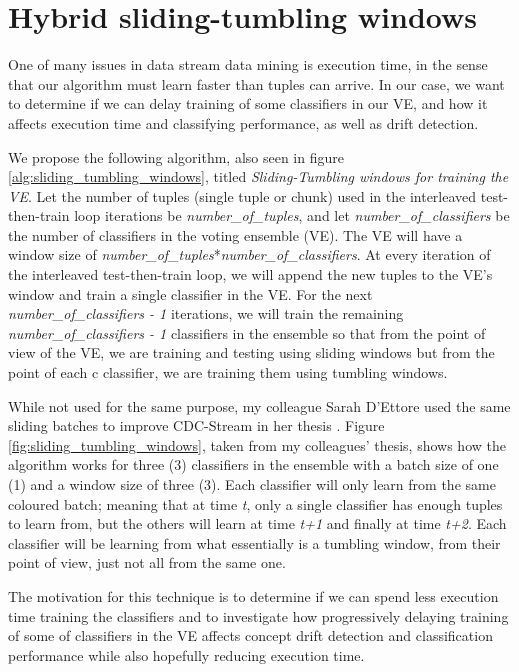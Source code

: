
\section{Hybrid sliding-tumbling windows}
One of many issues in data stream data mining is execution time, in the sense that our algorithm must learn faster than tuples can arrive. In our case, we want to determine if we can delay training of some classifiers in our VE, and how it affects execution time and classifying performance, as well as drift detection.

We propose the following algorithm, also seen in figure \ref{alg:sliding_tumbling_windows}, titled \textit{Sliding-Tumbling windows for training the VE}.
Let the number of tuples (single tuple or chunk) used in the interleaved test-then-train loop iterations be \textit{number\_of\_tuples}, and let \textit{number\_of\_classifiers} be the number of classifiers in the voting ensemble (VE). The VE will have a window size of \textit{number\_of\_tuples}*\textit{number\_of\_classifiers}. At every iteration of the interleaved test-then-train loop, we will append the new tuples to the VE's window and train a single classifier in the VE. For the next \textit{number\_of\_classifiers - 1} iterations, we will train the remaining \textit{number\_of\_classifiers - 1} classifiers in the ensemble so that from the point of view of the VE, we are training and testing using sliding windows but from the point of each c classifier, we are training them using tumbling windows.

While not used for the same purpose, my colleague Sarah D'Ettore used the same sliding batches to improve CDC-Stream in her thesis \citep{d2016fine}. Figure \ref{fig:sliding_tumbling_windows}, taken from my colleagues' thesis, shows how the algorithm works for three (3) classifiers in the ensemble with a batch size of one (1) and a window size of three (3). Each classifier will only learn from the same coloured batch; meaning that at time \textit{t}, only a single classifier has enough tuples to learn from, but the others will learn at time \textit{t+1} and finally at time \textit{t+2}. Each classifier will be learning from what essentially is a tumbling window, from their point of view, just not all from the same one.

The motivation for this technique is to determine if we can spend less execution time training the classifiers and to investigate how progressively delaying training of some of classifiers in the VE affects concept drift detection and classification performance while also hopefully reducing execution time.

